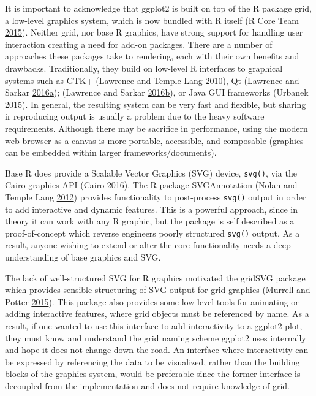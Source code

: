 \documentclass[12pt,]{isuthesis}
\begin{document}
It is important to acknowledge that ggplot2 is built on top of the R
package grid, a low-level graphics system, which is now bundled with R
itself (R Core Team \protect\hyperlink{ref-RCore}{2015}). Neither grid,
nor base R graphics, have strong support for handling user interaction
creating a need for add-on packages. There are a number of approaches
these packages take to rendering, each with their own benefits and
drawbacks. Traditionally, they build on low-level R interfaces to
graphical systems such as GTK+ (Lawrence and Temple Lang
\protect\hyperlink{ref-RGtk2}{2010}), Qt (Lawrence and Sarkar
\protect\hyperlink{ref-qtbase}{2016}\protect\hyperlink{ref-qtbase}{a});
(Lawrence and Sarkar
\protect\hyperlink{ref-qtpaint}{2016}\protect\hyperlink{ref-qtpaint}{b}),
or Java GUI frameworks (Urbanek \protect\hyperlink{ref-rJava}{2015}). In
general, the resulting system can be very fast and flexible, but sharing
ir reproducing output is usually a problem due to the heavy software
requirements. Although there may be sacrifice in performance, using the
modern web browser as a canvas is more portable, accessible, and
composable (graphics can be embedded within larger
frameworks/documents).

Base R does provide a Scalable Vector Graphics (SVG) device,
\texttt{svg()}, via the Cairo graphics API (Cairo
\protect\hyperlink{ref-cairo}{2016}). The R package SVGAnnotation (Nolan
and Temple Lang \protect\hyperlink{ref-SVGAnnotation}{2012}) provides
functionality to post-process \texttt{svg()} output in order to add
interactive and dynamic features. This is a powerful approach, since in
theory it can work with any R graphic, but the package is self described
as a proof-of-concept which reverse engineers poorly structured
\texttt{svg()} output. As a result, anyone wishing to extend or alter
the core functionality needs a deep understanding of base graphics and
SVG.

The lack of well-structured SVG for R graphics motivated the gridSVG
package which provides sensible structuring of SVG output for grid
graphics (Murrell and Potter \protect\hyperlink{ref-gridSVG}{2015}).
This package also provides some low-level tools for animating or adding
interactive features, where grid objects must be referenced by name. As
a result, if one wanted to use this interface to add interactivity to a
ggplot2 plot, they must know and understand the grid naming scheme
ggplot2 uses internally and hope it does not change down the road. An
interface where interactivity can be expressed by referencing the data
to be visualized, rather than the building blocks of the graphics
system, would be preferable since the former interface is decoupled from
the implementation and does not require knowledge of grid.
\end{document}
